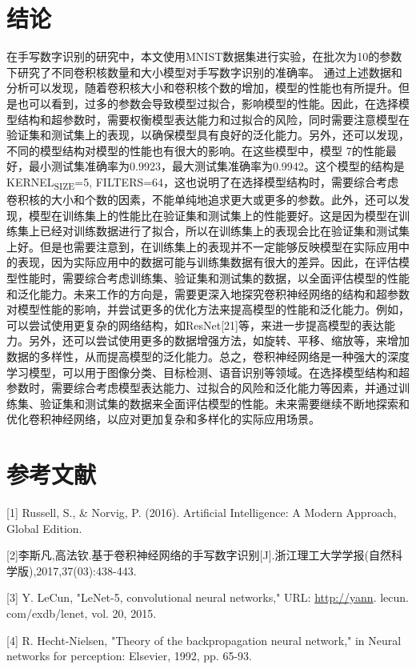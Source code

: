 \documentclass[11pt]{article}
\begin{document}
\section{结论}
\label{sec:orgcab6bb9}
在手写数字识别的研究中，本文使用MNIST数据集进行实验，在批次为10的参数下研究了不同卷积核数量和大小模型对手写数字识别的准确率。
通过上述数据和分析可以发现，随着卷积核大小和卷积核个数的增加，模型的性能也有所提升。但是也可以看到，过多的参数会导致模型过拟合，影响模型的性能。因此，在选择模型结构和超参数时，需要权衡模型表达能力和过拟合的风险，同时需要注意模型在验证集和测试集上的表现，以确保模型具有良好的泛化能力。另外，还可以发现，不同的模型结构对模型的性能也有很大的影响。在这些模型中，模型 7的性能最好，最小测试集准确率为0.9923，最大测试集准确率为0.9942。这个模型的结构是KERNEL\textsubscript{SIZE}=5, FILTERS=64，这也说明了在选择模型结构时，需要综合考虑卷积核的大小和个数的因素，不能单纯地追求更大或更多的参数。此外，还可以发现，模型在训练集上的性能比在验证集和测试集上的性能要好。这是因为模型在训练集上已经对训练数据进行了拟合，所以在训练集上的表现会比在验证集和测试集上好。但是也需要注意到，在训练集上的表现并不一定能够反映模型在实际应用中的表现，因为实际应用中的数据可能与训练集数据有很大的差异。因此，在评估模型性能时，需要综合考虑训练集、验证集和测试集的数据，以全面评估模型的性能和泛化能力。未来工作的方向是，需要更深入地探究卷积神经网络的结构和超参数对模型性能的影响，并尝试更多的优化方法来提高模型的性能和泛化能力。例如，可以尝试使用更复杂的网络结构，如ResNet[21]等，来进一步提高模型的表达能力。另外，还可以尝试使用更多的数据增强方法，如旋转、平移、缩放等，来增加数据的多样性，从而提高模型的泛化能力。总之，卷积神经网络是一种强大的深度学习模型，可以用于图像分类、目标检测、语音识别等领域。在选择模型结构和超参数时，需要综合考虑模型表达能力、过拟合的风险和泛化能力等因素，并通过训练集、验证集和测试集的数据来全面评估模型的性能。未来需要继续不断地探索和优化卷积神经网络，以应对更加复杂和多样化的实际应用场景。

\section{参考文献}
\label{sec:org0ce68a7}
[1] Russell, S., \& Norvig, P. (2016). Artificial Intelligence: A Modern Approach, Global Edition.

[2]李斯凡,高法钦.基于卷积神经网络的手写数字识别[J].浙江理工大学学报(自然科学版),2017,37(03):438-443.

[3]  Y. LeCun, "LeNet-5, convolutional neural networks," URL:  \url{http://yann}. lecun. com/exdb/lenet, vol. 20, 2015.

[4] R. Hecht-Nielsen, "Theory of the backpropagation neural  network," in Neural networks for perception: Elsevier, 1992, pp.  65-93.
\end{document}
